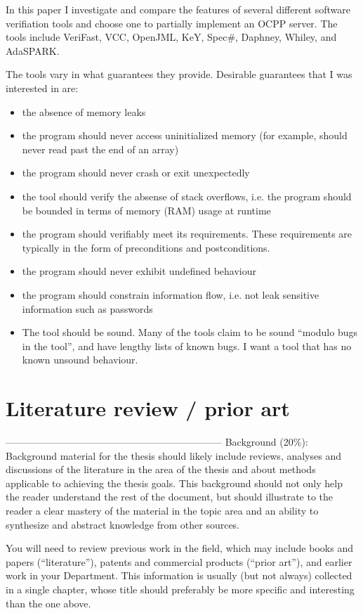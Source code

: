 \documentclass[12pt,openany,a4paper]{book}
\begin{document}
 
In this paper I investigate and compare the features of several different software verifiation tools and choose one to partially implement an OCPP server. The tools include VeriFast, VCC, OpenJML, KeY, Spec\#, Daphney, Whiley, and AdaSPARK.

The tools vary in what guarantees they provide. Desirable guarantees that I was interested in are: 
\label{criteria}
\begin{itemize}
	\item the absence of memory leaks
	\item the program should never access uninitialized memory (for example, should never read past the end of an array)
	\item the program should never crash or exit unexpectedly
	\item the tool should verify the absense of stack overflows, i.e. the program should be bounded in terms of memory (RAM) usage at runtime
	\item the program should verifiably meet its requirements. These requirements are typically in the form of preconditions and postconditions.
	\item the program should never exhibit undefined behaviour
	\item the program should constrain information flow, i.e. not leak sensitive information such as passwords
	\item The tool should be sound. Many of the tools claim to be sound ``modulo bugs in the tool'', and have lengthy lists of known bugs. I want a tool that has no known unsound behaviour.

\end{itemize}

\chapter{Literature review / prior art}

------------------------------------------------------------------
Background (20\%): Background material for the thesis should likely include reviews, analyses and
discussions of the literature in the area of the thesis and about methods applicable to achieving
the thesis goals. This background should not only help the reader understand the rest of the document,
but should illustrate to the reader a clear mastery of the material in the topic area and an
ability to synthesize and abstract knowledge from other sources.

You will need to review previous work in the field, which may include books and
papers (“literature”), patents and commercial products (“prior art”), and earlier
work in your Department. This information is usually (but not always) collected in
a single chapter, whose title should preferably be more specific and interesting than
the one above.
\end{document}
